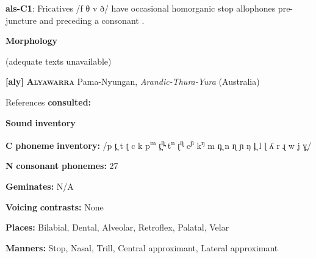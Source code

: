\documentclass[output=paper]{langsci/langscibook}
\begin{document}
\begin{styleBody}
\textbf{als-C1}: Fricatives /f θ v ð/ have occasional homorganic stop allophones pre-juncture and preceding a consonant \citep{Newmark1957}.
\end{styleBody}

\begin{styleBody}
\textbf{Morphology}
\end{styleBody}

\begin{styleBody}
(adequate texts unavailable)
\end{styleBody}

\begin{styleBody}
\textbf{[aly]}   \textbf{\textsc{Alyawarra}}  Pama-Nyungan, \textit{Arandic-Thura-Yura} (Australia)
\end{styleBody}

\begin{styleBody}
References \textbf{consulted:} \citet{Yallop1977}
\end{styleBody}

\begin{styleBody}
\textbf{Sound} \textbf{inventory}
\end{styleBody}

\begin{styleBody}
\textbf{C} \textbf{phoneme} \textbf{inventory:} /p t̪ t ʈ c k p\textsuperscript{m} t̪\textsuperscript{n̪} t\textsuperscript{n} ʈ\textsuperscript{ɳ} c\textsuperscript{ɲ} k\textsuperscript{ŋ} m n̪ n ɳ ɲ ŋ l̪ l ɭ ʎ r ɻ w j ɣ̞/
\end{styleBody}

\begin{styleBody}
\textbf{N} \textbf{consonant} \textbf{phonemes:} 27
\end{styleBody}

\begin{styleBody}
\textbf{Geminates:} N/A
\end{styleBody}

\begin{styleBody}
\textbf{Voicing} \textbf{contrasts:} None
\end{styleBody}

\begin{styleBody}
\textbf{Places:} Bilabial, Dental, Alveolar, Retroflex, Palatal, Velar
\end{styleBody}

\begin{styleBody}
\textbf{Manners:} Stop, Nasal, Trill, Central approximant, Lateral approximant
\end{styleBody}
\end{document}
